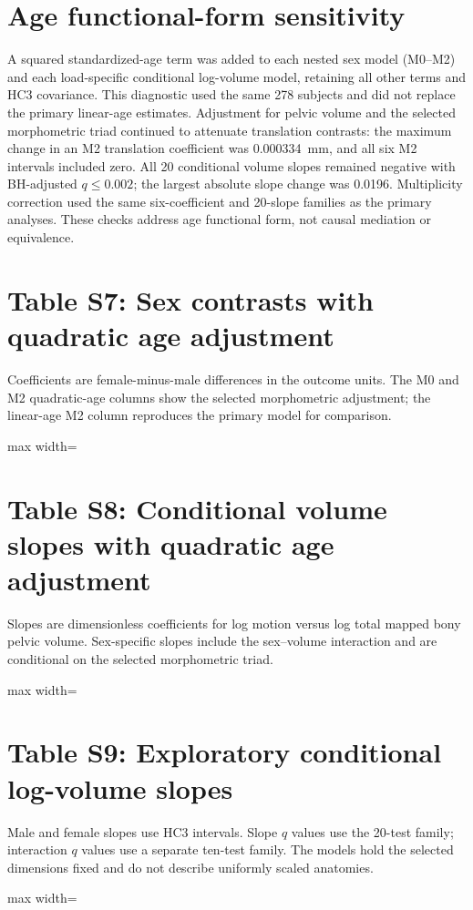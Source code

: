 \documentclass[11pt,a4paper]{article}
\newcommand{\SuppTableInput}[1]{%
  \par
  \begingroup
  \footnotesize
  \setlength{\tabcolsep}{4pt}%
  \renewcommand{\arraystretch}{1.1}%
  \noindent\centering
  \begin{adjustbox}{max width=\linewidth}
  \end{adjustbox}
  \par
  \endgroup
}
\begin{document}
\section*{Age functional-form sensitivity}
A squared standardized-age term was added to each nested sex model (M0--M2) and each load-specific conditional log-volume model, retaining all other terms and HC3 covariance. This diagnostic used the same 278 subjects and did not replace the primary linear-age estimates. Adjustment for pelvic volume and the selected morphometric triad continued to attenuate translation contrasts: the maximum change in an M2 translation coefficient was 0.000334~mm, and all six M2 intervals included zero. All 20 conditional volume slopes remained negative with BH-adjusted $q\leq0.002$; the largest absolute slope change was 0.0196. Multiplicity correction used the same six-coefficient and 20-slope families as the primary analyses. These checks address age functional form, not causal mediation or equivalence.

\section*{Table S7: Sex contrasts with quadratic age adjustment}
Coefficients are female-minus-male differences in the outcome units. The M0 and M2 quadratic-age columns show the selected morphometric adjustment; the linear-age M2 column reproduces the primary model for comparison.
\SuppTableInput{../tables/generated/supp_age_sex.tex}

\clearpage
\section*{Table S8: Conditional volume slopes with quadratic age adjustment}
Slopes are dimensionless coefficients for log motion versus log total mapped bony pelvic volume. Sex-specific slopes include the sex--volume interaction and are conditional on the selected morphometric triad.
\SuppTableInput{../tables/generated/supp_age_volume.tex}

\clearpage
\section*{Table S9: Exploratory conditional log-volume slopes}
Male and female slopes use HC3 intervals. Slope $q$ values use the 20-test family; interaction $q$ values use a separate ten-test family. The models hold the selected dimensions fixed and do not describe uniformly scaled anatomies.
\SuppTableInput{../tables/generated/table4b_allometry.tex}
\end{document}
